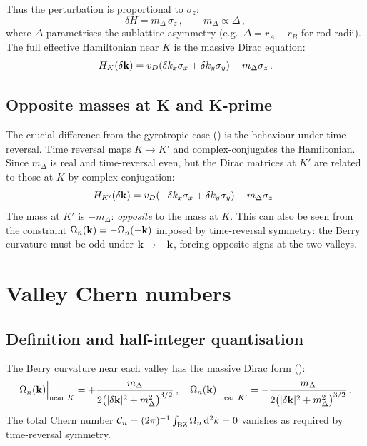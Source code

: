 Thus the perturbation is proportional to $\sigma_z$:
\begin{equation}\label{eq:ch12-mass-sigma-z}
  \delta H = m_\Delta\,\sigma_z\,,
  \qquad m_\Delta \propto \Delta\,,
\end{equation}
where $\Delta$ parametrises the sublattice asymmetry (e.g.\ $\Delta=
r_A-r_B$ for rod radii).  The full effective Hamiltonian near $K$ is the
massive Dirac equation:
\begin{equation}\label{eq:ch12-massive-dirac-K}
  H_K(\delta\mathbf{k}) = v_D(\delta k_x\sigma_x+\delta k_y\sigma_y)
  + m_\Delta\sigma_z\,.
\end{equation}

\subsection{Opposite masses at K and K-prime}
\label{sec:ch12-opposite-masses}

The crucial difference from the gyrotropic case
() is the behaviour under time reversal.  Time
reversal maps $K\to K'$ and complex-conjugates the Hamiltonian.  Since
$m_\Delta$ is real and time-reversal even, but the Dirac matrices at
$K'$ are related to those at $K$ by complex conjugation:
\begin{equation}\label{eq:ch12-massive-dirac-Kprime}
  H_{K'}(\delta\mathbf{k}) = v_D(-\delta k_x\sigma_x+\delta k_y\sigma_y)
  - m_\Delta\sigma_z\,.
\end{equation}
The mass at $K'$ is $-m_\Delta$: \emph{opposite} to the mass at $K$.
This can also be seen from the constraint $\Omega_n(\mathbf{k})
=-\Omega_n(-\mathbf{k})$ imposed by time-reversal symmetry: the Berry
curvature must be odd under $\mathbf{k}\to-\mathbf{k}$, forcing opposite signs
at the two valleys.

\section{Valley Chern numbers}
\label{sec:ch12-valley-chern}

\subsection{Definition and half-integer quantisation}
\label{sec:ch12-valley-def}

The Berry curvature near each valley has the massive Dirac form
():
\begin{equation}\label{eq:ch12-valley-curvature}
  \Omega_n(\mathbf{k})\Big|_{\text{near }K}
  = +\frac{m_\Delta}{2\bigl(|\delta\mathbf{k}|^2+m_\Delta^2\bigr)^{3/2}}\,,
  \quad
  \Omega_n(\mathbf{k})\Big|_{\text{near }K'}
  = -\frac{m_\Delta}{2\bigl(|\delta\mathbf{k}|^2+m_\Delta^2\bigr)^{3/2}}\,.
\end{equation}
The total Chern number $\mathcal{C}_n=(2\pi)^{-1}\int_{\mathrm{BZ}}\Omega_n\,\mathrm{d}^2k=0$
vanishes as required by time-reversal symmetry.

